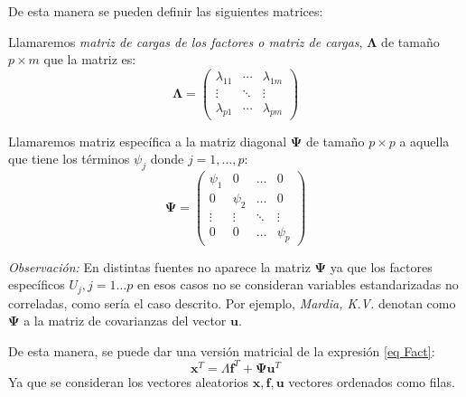 \noindent De esta manera se pueden definir las siguientes matrices: 

\begin{defi}
Llamaremos \emph{matriz de cargas de los factores o matriz de cargas}, $\mathbf{\Lambda}$ de tamaño $p \times m$ que la matriz es:
\begin{equation}
\mathbf{\Lambda}=\begin{pmatrix}
\lambda_{11} & \cdots & \lambda_{1 m}\\
\vdots & \ddots & \vdots\\
\lambda_{p1} & \cdots & \lambda_{pm}
\end{pmatrix}
\end{equation}
\end{defi}

\begin{defi}
Llamaremos matriz específica a la matriz diagonal $\mathbf{\Psi}$ de tamaño $p\times p$ a aquella que tiene los términos $\psi_j$ donde $j=1,\ldots , p$:
\begin{equation}
\mathbf{\Psi}=\begin{pmatrix}
    \psi_1 & 0 & \dots & 0 \\
    0 & \psi_2 & \dots & 0 \\
    \vdots & \vdots & \ddots & \vdots \\
    0 & 0 & \dots & \psi_p
\end{pmatrix}
\end{equation}
\end{defi}

\noindent \emph{Observación:} En distintas fuentes no aparece la matriz $\mathbf{\Psi}$ ya que los factores específicos $U_j, j=1\ldots p$ en esos casos no se consideran variables estandarizadas no correladas, como sería el caso descrito. Por ejemplo,  \emph{Mardia, K.V.} \cite{Mardia 1979} denotan como $\mathbf{\Psi}$ a la matriz de covarianzas del vector $\mathbf{u}$.

\noindent De esta manera, se puede dar una versión matricial de la expresión \ref{eq Fact}:
\begin{equation}
\mathbf{x}^T=\Lambda \mathbf{f}^T+ \mathbf{\Psi}\mathbf{u}^T
\end{equation}
Ya que se consideran los vectores aleatorios $\mathbf{x}, \mathbf{f}, \mathbf{u}$ vectores ordenados como filas. 

